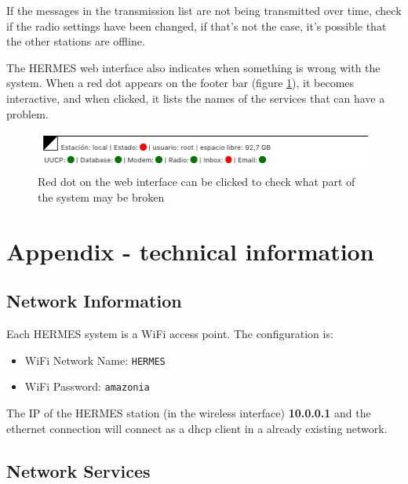 \documentclass[11pt,a4paper]{article}
\begin{document}
If the messages in the transmission list are not being transmitted over time, check if the radio settings have been changed, if that's not the case, it's possible that the other stations are offline.

The HERMES web interface also indicates when something is wrong with the system. When a red dot appears on the footer bar (figure \ref{fig:status}), it becomes interactive, and when clicked, it lists the names of the services that can have a problem.

\begin{figure}[H]
    \centering
    \includegraphics[width=0.8\columnwidth]{screenshots/frontend/es_old/status.png}
    	\caption{Red dot on the web interface can be clicked to check what part of the system may be broken}
    \label{fig:status}
\end{figure}


\pagebreak
{}
\label{techinfo}
\section{Appendix - technical information}
\subsection{Network Information}
\label{apx_net_info}

Each HERMES system is a WiFi access point. The configuration is:
\begin{itemize}
\item WiFi Network Name: \texttt{HERMES}
\item WiFi Password: \texttt{amazonia}
\end{itemize}

The IP of the HERMES station (in the wireless interface) \textbf{10.0.0.1} and the ethernet connection will connect as a dhcp client in a already existing network. 

\subsection{Network Services} 
\label{apx_net_services}
\end{document}
